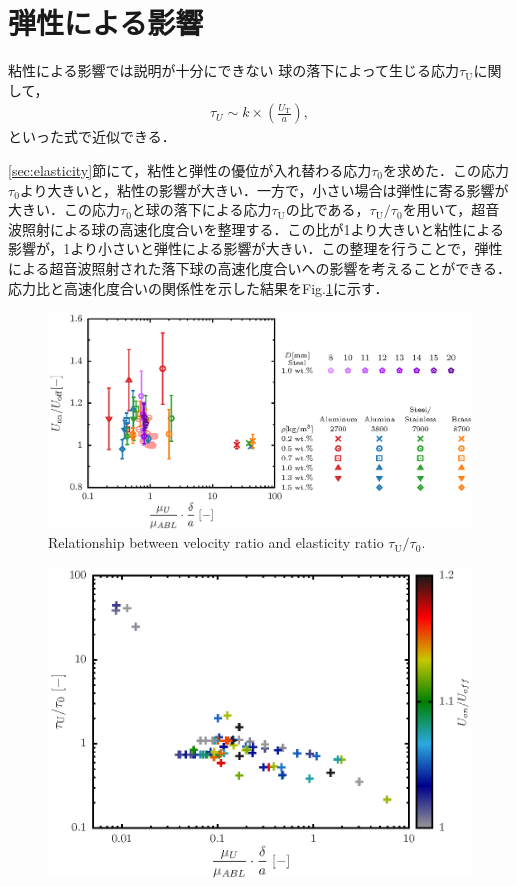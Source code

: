 \section{弾性による影響}

粘性による影響では説明が十分にできない
球の落下によって生じる応力$\tau_\text{U}$に関して，
\begin{eqnarray}
    \tau_U \sim k \times \left(\frac{U_\text{T}}{a}\right),
    \label{eq:tauU}
\end{eqnarray}
といった式で近似できる．

\ref{sec:elasticity}節にて，粘性と弾性の優位が入れ替わる応力$\tau_\text{0}$を求めた．この応力$\tau_\text{0}$より大きいと，粘性の影響が大きい．一方で，小さい場合は弾性に寄る影響が大きい．この応力$\tau_\text{0}$と球の落下による応力$\tau_\text{U}$の比である，$\tau_\text{U}/\tau_\text{0}$を用いて，超音波照射による球の高速化度合いを整理する．この比が1より大きいと粘性による影響が，1より小さいと弾性による影響が大きい．この整理を行うことで，弾性による超音波照射された落下球の高速化度合いへの影響を考えることができる．応力比と高速化度合いの関係性を示した結果をFig.\ref{fig:elastcity}に示す．

\begin{figure}[h]
    \centering
    \includegraphics[width=1.0\textwidth]{5-Results/elastcity.eps}
    \caption{Relationship between velocity ratio and elasticity ratio $\tau_\text{U}/\tau_\text{0}$.}
    \label{fig:elastcity}
\end{figure}

\begin{figure}[h]
    \centering
    \includegraphics[width=1.0\textwidth]{5-Results/elastcity_color.eps}
    \caption{}
    \label{fig:elastcityColor}
\end{figure}
